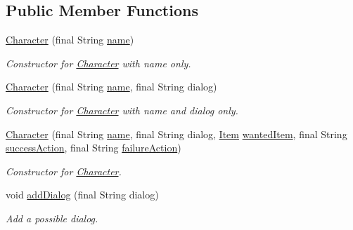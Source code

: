 \subsection*{Public Member Functions}
\begin{DoxyCompactItemize}
\item 
\hyperlink{classpkg__world_1_1pkg__characters_1_1Character_a50bcfb95d983b94d0335bd457d575872}{Character} (final String \hyperlink{classpkg__world_1_1pkg__characters_1_1Character_a54831aae75fcaacb68cb500a12ffe457}{name})
\begin{DoxyCompactList}\small\item\em Constructor for \hyperlink{classpkg__world_1_1pkg__characters_1_1Character}{Character} with name only. \end{DoxyCompactList}\item 
\hyperlink{classpkg__world_1_1pkg__characters_1_1Character_a1dcca115f6536e7d4d99ab3880291376}{Character} (final String \hyperlink{classpkg__world_1_1pkg__characters_1_1Character_a54831aae75fcaacb68cb500a12ffe457}{name}, final String dialog)
\begin{DoxyCompactList}\small\item\em Constructor for \hyperlink{classpkg__world_1_1pkg__characters_1_1Character}{Character} with name and dialog only. \end{DoxyCompactList}\item 
\hyperlink{classpkg__world_1_1pkg__characters_1_1Character_a3944beae4c725dac40c288715af8061c}{Character} (final String \hyperlink{classpkg__world_1_1pkg__characters_1_1Character_a54831aae75fcaacb68cb500a12ffe457}{name}, final String dialog, \hyperlink{classpkg__world_1_1pkg__items_1_1Item}{Item} \hyperlink{classpkg__world_1_1pkg__characters_1_1Character_a3e5abf14759d18446163db9597d10a44}{wanted\-Item}, final String \hyperlink{classpkg__world_1_1pkg__characters_1_1Character_a3f1c0fc80b859a8625f334782b1bb74a}{success\-Action}, final String \hyperlink{classpkg__world_1_1pkg__characters_1_1Character_add959e452ec866785ef0d48f054b13ab}{failure\-Action})
\begin{DoxyCompactList}\small\item\em Constructor for \hyperlink{classpkg__world_1_1pkg__characters_1_1Character}{Character}. \end{DoxyCompactList}\item 
void \hyperlink{classpkg__world_1_1pkg__characters_1_1Character_a926da3833d26f4800fcd62917be5abcc}{add\-Dialog} (final String dialog)
\begin{DoxyCompactList}\small\item\em Add a possible dialog. \end{DoxyCompactList}\item 

\end{DoxyCompactItemize}
